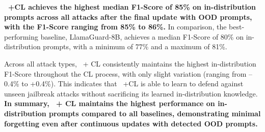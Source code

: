 \textbf{\ourapp~+CL achieves the highest median F1-Score of 85\% on in-distribution prompts across all attacks after the final update with OOD prompts, with the F1-Score ranging from 85\% to 86\%.}
In comparison, the best-performing baseline, LlamaGuard-8B, achieves a median F1-Score of 80\% on in-distribution prompts, with a minimum of 77\% and a maximum of 81\%.

Across all attack types, \ourapp~+ CL consistently maintains the highest in-distribution F1-Score throughout the CL process, with only slight variation (ranging from –0.4\% to +0.4\%).
This indicates that \ourapp~+CL is able to learn to defend against unseen jailbreak attacks without sacrificing its learned in-distribution knowledge.
\textbf{In summary, \ourapp~+ CL maintains the highest performance on in-distribution prompts compared to all baselines, demonstrating minimal forgetting even after continuous updates with detected OOD prompts.}
